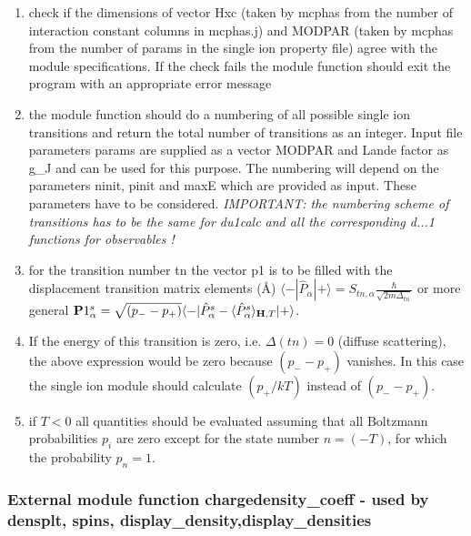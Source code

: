 \begin{enumerate}
\item check if the dimensions of vector Hxc (taken by {\prg mcphas} from the number of 
interaction constant columns in {\prg mcphas.j})
 and MODPAR (taken by {\prg mcphas} from the number of params in the single ion property
file) agree with the module specifications. If the check fails the module function should exit the
program with an appropriate error message
\item the module function should do a numbering of all possible single ion transitions and return
the total number of transitions as an integer. Input file parameters params are supplied as a vector MODPAR and
Lande factor as g\_J and  can be used for this purpose. The numbering will depend on
the parameters ninit, pinit and maxE which are provided as input. These parameters
have to be considered. {\em IMPORTANT: the numbering scheme of transitions has to
be the same for du1calc and all the corresponding d...1 functions for observables !}
\item for the transition number tn the vector p1 is to
 be filled with the displacement transition matrix elements (\AA)
$\langle-|\hat P_{\alpha}|+\rangle=S_{tn,\alpha}\frac{\hbar}{\sqrt{2m\Delta_{tn}}}$
or more general
${\mathbf P1^s_{\alpha}}=\sqrt{(p_--p_+)}\langle -|\hat P^s_{\alpha}-\langle\hat  P^s_{\alpha}\rangle_{\mathbf H,T}|+\rangle$.
\item
If the energy of this transition
is zero, i.e. $\Delta(tn)=0$ (diffuse scattering), 
the above expression  would be zero because $(p_--p_+)$ vanishes.
In this case the single ion module should calculate $(p_+/kT)$ instead of $(p_--p_+)$.
\item if $T<0$ all quantities should be evaluated assuming that all Boltzmann probabilities $p_i$
 are zero except for the state number $n=(-T)$, for which the probability $p_n=1$.
\end{enumerate}
 


\subsubsection{External module function {\prg chargedensity\_coeff} -
used by {\prg densplt},
{\prg spins},
{\prg display\_density},{\prg display\_densities}}

